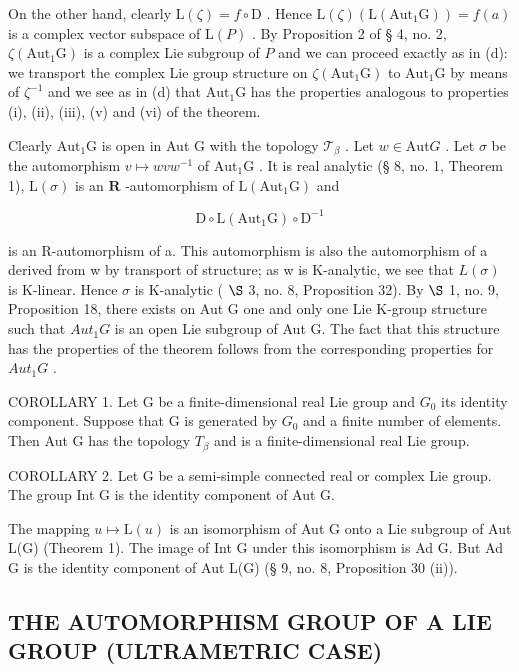 On the other hand, clearly \(\mathrm{L}(\zeta) = f\circ \mathrm{D}\) . Hence \(\mathrm{L}(\zeta)(\mathrm{L}(\mathrm{Aut}_1\mathrm{G})) = f(a)\) is a complex vector subspace of \(\mathrm{L}(P)\) . By Proposition 2 of § 4, no. 2, \(\zeta (\mathrm{Aut}_1\mathrm{G})\) is a complex Lie subgroup of \(P\) and we can proceed exactly as in (d): we transport the complex Lie group structure on \(\zeta (\mathrm{Aut}_1\mathrm{G})\) to \(\mathrm{Aut}_1\mathrm{G}\) by means of \(\zeta^{-1}\) and we see as in (d) that \(\mathrm{Aut}_1\mathrm{G}\) has the properties analogous to properties (i), (ii), (iii), (v) and (vi) of the theorem.

Clearly \(\mathrm{Aut}_1\mathrm{G}\) is open in Aut G with the topology \(\mathcal{T}_{\beta}\) . Let \(w\in \mathrm{Aut}G\) . Let \(\sigma\) be the automorphism \(v\mapsto wvw^{-1}\) of \(\mathrm{Aut}_1\mathrm{G}\) . It is real analytic (§ 8, no. 1, Theorem 1), \(\mathrm{L}(\sigma)\) is an \(\mathbf{R}\) -automorphism of \(\mathrm{L}(\mathrm{Aut}_1\mathrm{G})\) and

\[
\mathrm{D} \circ \mathrm{L} (\mathrm{Aut} _ {1} \mathrm{G}) \circ \mathrm{D} ^ {- 1}
\]

is an R-automorphism of a. This automorphism is also the automorphism of a derived from w by transport of structure; as w is K-analytic, we see that \(L(\sigma)\) is K-linear. Hence \(\sigma\) is K-analytic ( \(\S\) 3, no. 8, Proposition 32). By \(\S\) 1, no. 9, Proposition 18, there exists on Aut G one and only one Lie K-group structure such that \(Aut_1G\) is an open Lie subgroup of Aut G. The fact that this structure has the properties of the theorem follows from the corresponding properties for \(Aut_1G\) .

COROLLARY 1. Let G be a finite-dimensional real Lie group and \(G_{0}\) its identity component. Suppose that G is generated by \(G_{0}\) and a finite number of elements. Then Aut G has the topology \(T_{\beta}\) and is a finite-dimensional real Lie group.

COROLLARY 2. Let G be a semi-simple connected real or complex Lie group. The group Int G is the identity component of Aut G.

The mapping \(u \mapsto \mathrm{L}(u)\) is an isomorphism of Aut G onto a Lie subgroup of Aut L(G) (Theorem 1). The image of Int G under this isomorphism is Ad G. But Ad G is the identity component of Aut L(G) (§ 9, no. 8, Proposition 30 (ii)).

\subsection{THE AUTOMORPHISM GROUP OF A LIE GROUP (ULTRAMETRIC CASE)}

